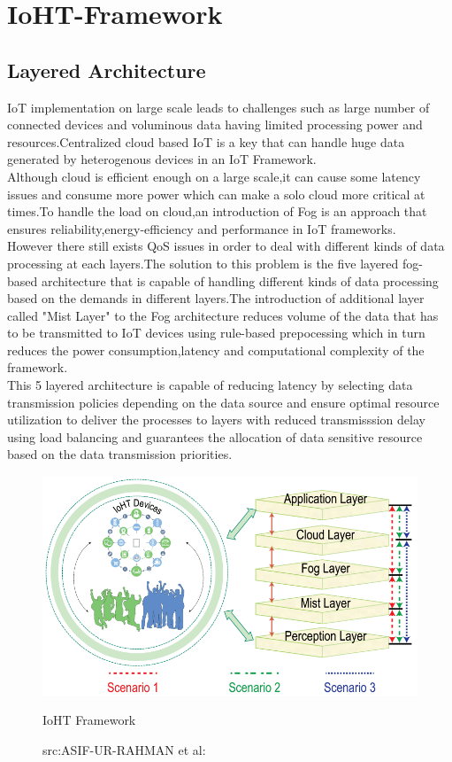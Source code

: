 \section{IoHT-Framework}\label{sec:three}
\subsection{Layered Architecture}
IoT implementation on large scale leads to challenges such as large number of connected devices and voluminous data having limited processing power and resources.Centralized cloud based IoT is a key that can handle huge data generated by heterogenous devices in an IoT Framework.\\
Although cloud is efficient enough on a large scale,it can cause some latency issues and consume more power which can make a solo cloud more critical at times.To handle the load on cloud,an introduction of Fog is an approach that ensures reliability,energy-efficiency and performance in IoT frameworks\cite{rahmani2018exploiting}\cite{3}.\\

However there still exists QoS issues in order to deal with different kinds of data processing at each layers.The solution to this problem is the five layered fog-based architecture that is capable of handling different kinds of data processing based on the demands in different layers.The introduction of additional layer called "Mist Layer" to the Fog architecture reduces volume of the data that has to be transmitted to IoT devices using rule-based prepocessing which in turn reduces the power consumption,latency and computational complexity of the framework\cite{3}.\\

This 5 layered architecture is capable of reducing latency by selecting data transmission policies depending on the data source and ensure optimal resource utilization to deliver the processes to layers with reduced transmisssion delay using load balancing and guarantees the allocation of data sensitive resource based on the data transmission priorities.\\


\begin{figure}[H]
	\centering
	\includegraphics[width=\linewidth]{image/framework.png}
	\caption{IoHT Framework}
	\caption*{src:ASIF-UR-RAHMAN et al:\cite{3}}
\end{figure}

